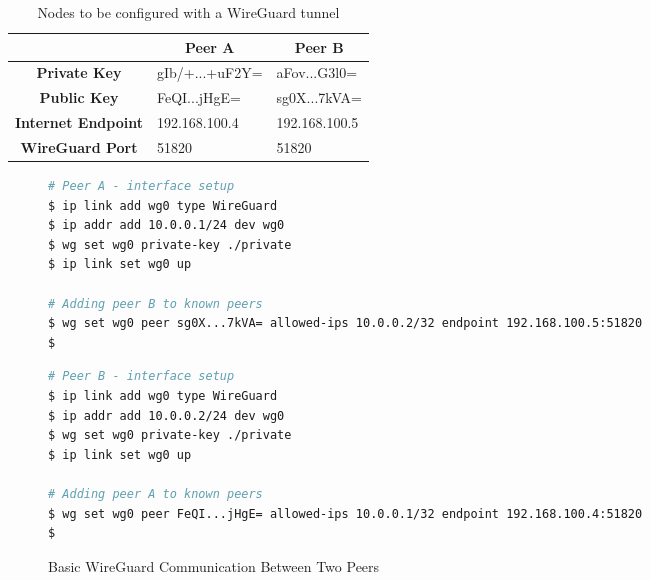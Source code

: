 \documentclass[11pt,twoside,a4paper]{report}
\begin{document}
\begin{table}[]
\centering
\begin{tabular}{c|l|l|}
\cline{2-3}
\multicolumn{1}{l|}{}                            & \multicolumn{1}{c|}{\textbf{Peer A}} & \multicolumn{1}{c|}{\textbf{Peer B}} \\ \hline
\multicolumn{1}{|c|}{\textbf{Private Key}}       & gIb/+...+uF2Y=                       & aFov...G3l0=                         \\ \hline
\multicolumn{1}{|c|}{\textbf{Public Key}}        & FeQI...jHgE=                         & sg0X...7kVA=                         \\ \hline
\multicolumn{1}{|c|}{\textbf{Internet Endpoint}} & 192.168.100.4                        & 192.168.100.5                        \\ \hline
\multicolumn{1}{|c|}{\textbf{WireGuard Port}}    & 51820                                & 51820                                \\ \hline
\end{tabular}
\caption{Nodes to be configured with a WireGuard tunnel}
\label{tab:wgconfpeers}
\end{table}

\begin{figure}
\begin{multicols}{2}
\begin{lstlisting}[language=sh, frame=single, breaklines=true, breakatwhitespace=true, basicstyle=\small]
# Peer A - interface setup
$ ip link add wg0 type WireGuard
$ ip addr add 10.0.0.1/24 dev wg0
$ wg set wg0 private-key ./private
$ ip link set wg0 up

# Adding peer B to known peers
$ wg set wg0 peer sg0X...7kVA= allowed-ips 10.0.0.2/32 endpoint 192.168.100.5:51820
$

\end{lstlisting}
\columnbreak
\begin{lstlisting}[language=sh, frame=single, breaklines=true, breakatwhitespace=true, basicstyle=\small]
# Peer B - interface setup
$ ip link add wg0 type WireGuard
$ ip addr add 10.0.0.2/24 dev wg0
$ wg set wg0 private-key ./private
$ ip link set wg0 up

# Adding peer A to known peers
$ wg set wg0 peer FeQI...jHgE= allowed-ips 10.0.0.1/32 endpoint 192.168.100.4:51820
$

\end{lstlisting}
\end{multicols}
\caption{Basic WireGuard Communication Between Two Peers}
\label{fig:wgconf}
\end{figure}
\end{document}
